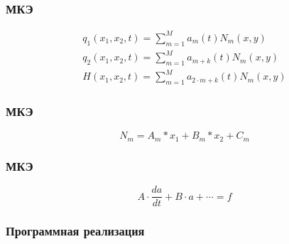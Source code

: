 \documentclass[10pt,utf8,presentation,compress]{beamer}
\begin{document}
\begin{frame}
\frametitle{МКЭ}
	\begin{eqnarray*}
		q_1(x_1, x_2, t) = \sum\limits_{m=1}^{M} a_m(t)N_m(x, y) \\
		q_2(x_1, x_2, t) = \sum\limits_{m=1}^{M} a_{m+k}(t)N_m(x, y) \\
		H(x_1, x_2, t) = \sum\limits_{m=1}^{M} a_{2\cdot m+k}(t)N_m(x, y)
	\end{eqnarray*}
\end{frame}

\begin{frame}
\frametitle{МКЭ}
	\begin{equation}
		N_m = A_m * x_1 + B_m * x_2 + C_m
	\end{equation}
\end{frame}

\begin{frame}
\frametitle{МКЭ}
	\begin{equation}
		A \cdot \frac{da}{dt} + B \cdot a + \cdots = f
	\end{equation}
\end{frame}

\begin{frame}
\frametitle{Программная реализация}
	\begin{figure}[H]
		\centering
		\hfill
	\end{figure}
\end{frame}
\end{document}
